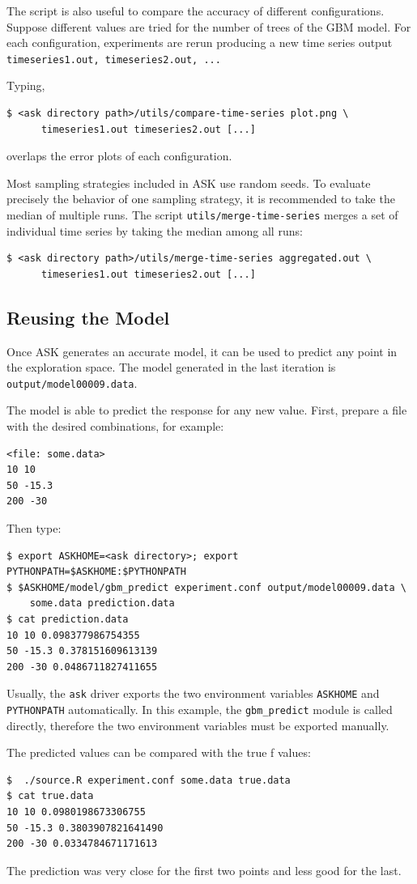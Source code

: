 The script is also useful to compare the accuracy of different configurations. Suppose different values are tried for the number of trees of the GBM model. For each configuration, experiments are rerun producing a new time series output \texttt{timeseries1.out, timeseries2.out, ...} 

Typing, 
\begin{verbatim}
$ <ask directory path>/utils/compare-time-series plot.png \
      timeseries1.out timeseries2.out [...]
\end{verbatim}

overlaps the error plots of each configuration.

Most sampling strategies included in ASK use random seeds. To evaluate precisely the behavior of one sampling strategy, it is recommended to take the median of multiple runs. The script \texttt{utils/merge-time-series} merges a set of individual time series by taking the median among all runs:
\begin{verbatim}
$ <ask directory path>/utils/merge-time-series aggregated.out \
      timeseries1.out timeseries2.out [...]
\end{verbatim}

\subsection{Reusing the Model}

Once ASK generates an accurate model, it can be used to predict any point in the exploration space. The model generated in the last iteration is \texttt{output/model00009.data}.

The model is able to predict the response for any new value. First, prepare a file with the desired combinations, for example:
\begin{verbatim}
<file: some.data>
10 10
50 -15.3
200 -30
\end{verbatim}

Then type:
\begin{verbatim}
$ export ASKHOME=<ask directory>; export PYTHONPATH=$ASKHOME:$PYTHONPATH
$ $ASKHOME/model/gbm_predict experiment.conf output/model00009.data \
    some.data prediction.data
$ cat prediction.data
10 10 0.098377986754355
50 -15.3 0.378151609613139
200 -30 0.0486711827411655
\end{verbatim}

Usually, the \texttt{ask} driver exports the two environment variables \texttt{ASKHOME} and \texttt{PYTHONPATH} automatically. In this example, the \texttt{gbm\_predict} module is called directly, therefore the two environment variables must be exported manually.

The predicted values can be compared with the true f values:

\begin{verbatim}
$  ./source.R experiment.conf some.data true.data
$ cat true.data
10 10 0.0980198673306755
50 -15.3 0.3803907821641490
200 -30 0.0334784671171613
\end{verbatim}

The prediction was very close for the first two points and less good for the last. 

